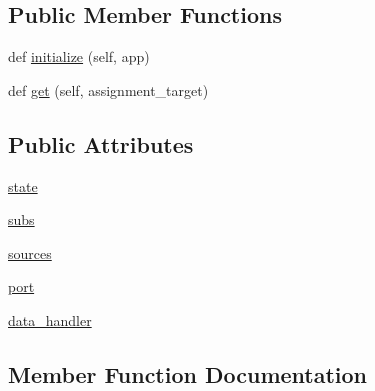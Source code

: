 \subsection*{Public Member Functions}
\begin{DoxyCompactItemize}
\item 
def \hyperlink{classparlai_1_1mturk_1_1webapp_1_1server_1_1AssignmentHandler_a4d6fc0f6605557f5ede04d06db680640}{initialize} (self, app)
\item 
def \hyperlink{classparlai_1_1mturk_1_1webapp_1_1server_1_1AssignmentHandler_aefae6e70faeaf069860b5d63079b68a1}{get} (self, assignment\+\_\+target)
\end{DoxyCompactItemize}
\subsection*{Public Attributes}
\begin{DoxyCompactItemize}
\item 
\hyperlink{classparlai_1_1mturk_1_1webapp_1_1server_1_1AssignmentHandler_a91eb25d50a115871504574869c53ee15}{state}
\item 
\hyperlink{classparlai_1_1mturk_1_1webapp_1_1server_1_1AssignmentHandler_a1c7b99d261745891f7f408a8ee575384}{subs}
\item 
\hyperlink{classparlai_1_1mturk_1_1webapp_1_1server_1_1AssignmentHandler_a2a9d201d89e660f9337dce5b79f7969c}{sources}
\item 
\hyperlink{classparlai_1_1mturk_1_1webapp_1_1server_1_1AssignmentHandler_adfbd99a455bf117e46d06af4b54f4995}{port}
\item 
\hyperlink{classparlai_1_1mturk_1_1webapp_1_1server_1_1AssignmentHandler_a4c052c9d3481b6c237b86cc00238b46e}{data\+\_\+handler}
\end{DoxyCompactItemize}


\subsection{Member Function Documentation}
\mbox{\label{classparlai_1_1mturk_1_1webapp_1_1server_1_1AssignmentHandler_aefae6e70faeaf069860b5d63079b68a1}} 
